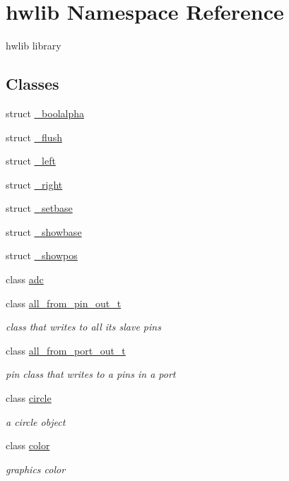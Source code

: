 \hypertarget{namespacehwlib}{}\section{hwlib Namespace Reference}
\label{namespacehwlib}


hwlib library  


\subsection*{Classes}
\begin{DoxyCompactItemize}
\item 
struct \hyperlink{structhwlib_1_1__boolalpha}{\+\_\+boolalpha}
\item 
struct \hyperlink{structhwlib_1_1__flush}{\+\_\+flush}
\item 
struct \hyperlink{structhwlib_1_1__left}{\+\_\+left}
\item 
struct \hyperlink{structhwlib_1_1__right}{\+\_\+right}
\item 
struct \hyperlink{structhwlib_1_1__setbase}{\+\_\+setbase}
\item 
struct \hyperlink{structhwlib_1_1__showbase}{\+\_\+showbase}
\item 
struct \hyperlink{structhwlib_1_1__showpos}{\+\_\+showpos}
\item 
class \hyperlink{classhwlib_1_1adc}{adc}
\item 
class \hyperlink{classhwlib_1_1all__from__pin__out__t}{all\+\_\+from\+\_\+pin\+\_\+out\+\_\+t}
\begin{DoxyCompactList}\small\item\em class that writes to all its slave pins \end{DoxyCompactList}\item 
class \hyperlink{classhwlib_1_1all__from__port__out__t}{all\+\_\+from\+\_\+port\+\_\+out\+\_\+t}
\begin{DoxyCompactList}\small\item\em pin class that writes to a pins in a port \end{DoxyCompactList}\item 
class \hyperlink{classhwlib_1_1circle}{circle}
\begin{DoxyCompactList}\small\item\em a circle object \end{DoxyCompactList}\item 
class \hyperlink{classhwlib_1_1color}{color}
\begin{DoxyCompactList}\small\item\em graphics color \end{DoxyCompactList}\item 

\end{DoxyCompactItemize}
